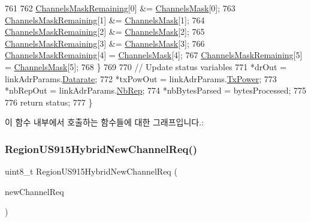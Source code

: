 \begin{DoxyCode}
761 
762         \mbox{\hyperlink{_region_u_s915-_hybrid_8c_a567333cec639a004655cc1717e9d0928}{ChannelsMaskRemaining}}[0] &= \mbox{\hyperlink{_region_u_s915-_hybrid_8c_a2188957b5ca6af8092154d7ccbfa5757}{ChannelsMask}}[0];
763         \mbox{\hyperlink{_region_u_s915-_hybrid_8c_a567333cec639a004655cc1717e9d0928}{ChannelsMaskRemaining}}[1] &= \mbox{\hyperlink{_region_u_s915-_hybrid_8c_a2188957b5ca6af8092154d7ccbfa5757}{ChannelsMask}}[1];
764         \mbox{\hyperlink{_region_u_s915-_hybrid_8c_a567333cec639a004655cc1717e9d0928}{ChannelsMaskRemaining}}[2] &= \mbox{\hyperlink{_region_u_s915-_hybrid_8c_a2188957b5ca6af8092154d7ccbfa5757}{ChannelsMask}}[2];
765         \mbox{\hyperlink{_region_u_s915-_hybrid_8c_a567333cec639a004655cc1717e9d0928}{ChannelsMaskRemaining}}[3] &= \mbox{\hyperlink{_region_u_s915-_hybrid_8c_a2188957b5ca6af8092154d7ccbfa5757}{ChannelsMask}}[3];
766         \mbox{\hyperlink{_region_u_s915-_hybrid_8c_a567333cec639a004655cc1717e9d0928}{ChannelsMaskRemaining}}[4] = \mbox{\hyperlink{_region_u_s915-_hybrid_8c_a2188957b5ca6af8092154d7ccbfa5757}{ChannelsMask}}[4];
767         \mbox{\hyperlink{_region_u_s915-_hybrid_8c_a567333cec639a004655cc1717e9d0928}{ChannelsMaskRemaining}}[5] = \mbox{\hyperlink{_region_u_s915-_hybrid_8c_a2188957b5ca6af8092154d7ccbfa5757}{ChannelsMask}}[5];
768     \}
769 
770     \textcolor{comment}{// Update status variables}
771     *drOut = linkAdrParams.\mbox{\hyperlink{structs_region_common_link_adr_params_ae2f6080f3aa0e9485c55513ca56bb24d}{Datarate}};
772     *txPowOut = linkAdrParams.\mbox{\hyperlink{structs_region_common_link_adr_params_a037b4f849fa8ed4aa1d3c58aef2b28ec}{TxPower}};
773     *nbRepOut = linkAdrParams.\mbox{\hyperlink{structs_region_common_link_adr_params_a3b99538671d86dbfe2f6754ce6f9577a}{NbRep}};
774     *nbBytesParsed = bytesProcessed;
775 
776     \textcolor{keywordflow}{return} status;
777 \}
\end{DoxyCode}
이 함수 내부에서 호출하는 함수들에 대한 그래프입니다.\+:
\mbox{\label{group___r_e_g_i_o_n_u_s915_h_y_b_ga8555b0827350263310c34afbb060842e}} 
\subsubsection{\texorpdfstring{Region\+U\+S915\+Hybrid\+New\+Channel\+Req()}{RegionUS915HybridNewChannelReq()}}
{\footnotesize\ttfamily uint8\+\_\+t Region\+U\+S915\+Hybrid\+New\+Channel\+Req (\begin{DoxyParamCaption}\item[{\mbox{\hyperlink{group___r_e_g_i_o_n_gae2abcdb6dbb843c9faf5fd3009eca9d6}{New\+Channel\+Req\+Params\+\_\+t}} $\ast$}]{new\+Channel\+Req }\end{DoxyParamCaption})}



